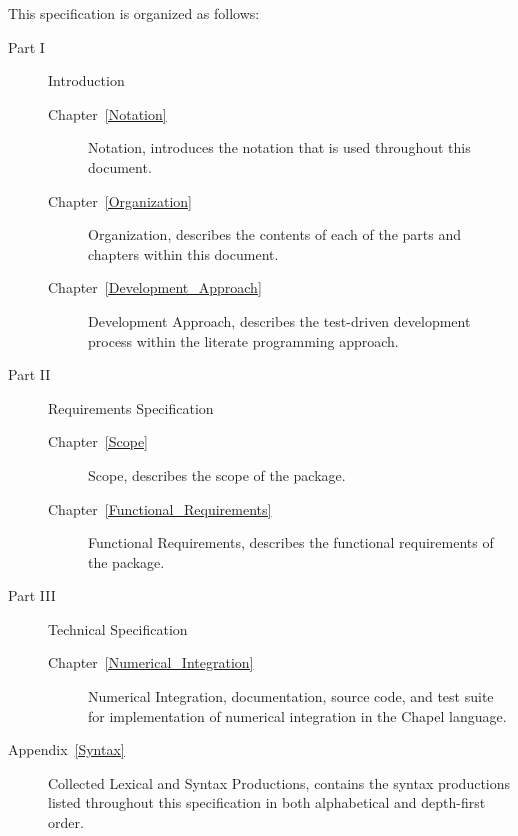\label{Organization}

This specification is organized as follows:

\begin{description}
\item[Part I] Introduction

\begin{description}

\item[Chapter~\ref{Notation}] Notation, introduces the notation that is used
throughout this document.


\item[Chapter~\ref{Organization}] Organization, describes the contents of
each of the parts and chapters within this document.

\item[Chapter~\ref{Development_Approach}] Development Approach, describes 
the test-driven development process within the literate programming approach.
\end{description}

\item[Part II] Requirements Specification

\begin{description}
\item[Chapter~\ref{Scope}] Scope, describes the scope of the package.
\end{description}

\begin{description}
\item[Chapter~\ref{Functional_Requirements}] Functional Requirements, describes the 
functional requirements of the package.
\end{description}

\item[Part III] Technical Specification

\begin{description}
\item[Chapter~\ref{Numerical_Integration}] Numerical Integration, documentation, source
code, and test suite for implementation of numerical integration in the Chapel language.
\end{description}

\item[Appendix~\ref{Syntax}] Collected Lexical and Syntax Productions,
contains the syntax productions listed throughout this specification
in both alphabetical and depth-first order.

\end{description}
